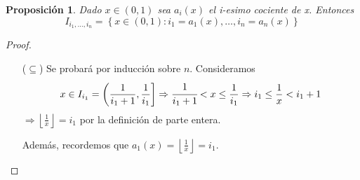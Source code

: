 \documentclass[12pt]{report}
\newtheorem{prop}{Proposición}[section]
\begin{document}
\begin{prop}
Dado $x \in(0,1)$ sea $a_{i}(x)$ el i-esimo cociente de x. Entonces
$$
I_{i_{1}, \ldots, i_{n}}=\left\{x \in(0,1): i_{1}=a_{1}(x), \ldots, i_{n}=a_{n}(x)\right\}
$$
\label{teo3-2}
\end{prop}
\begin{proof}\hfill
\begin{itemize}
    \item[($\subseteq$)]Se probará por inducción sobre $n$.
    Consideramos
    $$
    x \in I_{i_{1}}=\left(\frac{1}{i_{1}+1}, \frac{1}{i_{1}}\right]\Rightarrow \cfrac{1}{i_{1}+1}<x\leq\frac{1}{i_{1}}\Rightarrow i_{1} \leq \frac{1}{x} < i_{1}+1
    $$
    $\Rightarrow \left\lfloor\frac{1}{x}\right\rfloor = i_{1}$ por la definición de parte entera.
    
    
    Además, recordemos que $a_{1}(x)=\left\lfloor\frac{1}{x}\right\rfloor=i_{1}$.
    

\end{itemize}
\end{proof}
\end{document}
